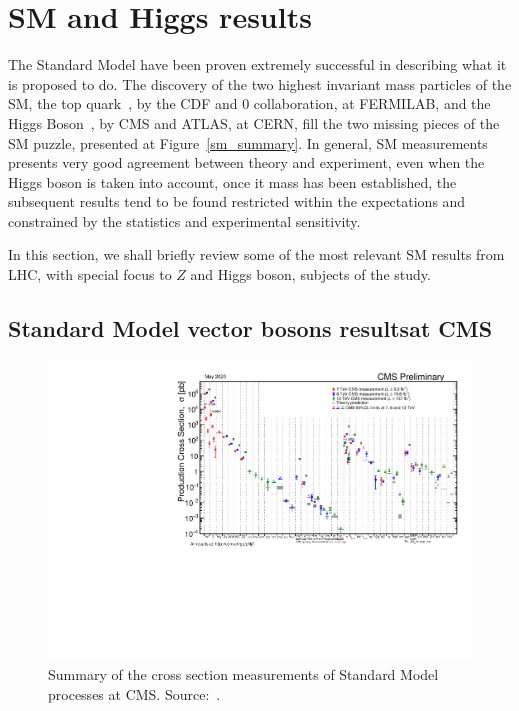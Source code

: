 \clearpage

\section{SM and Higgs results}
\label{section_sm_higgs}

The Standard Model have been proven extremely successful in describing what it is proposed to do. The discovery of the two highest invariant mass particles of the SM, the top quark~\cite{top_discovery_cdf,top_discovery_d0}, by the CDF and 0 collaboration, at FERMILAB, and the Higgs Boson~\cite{higgs_discovery_cms,higgs_discovery_atlas}, by CMS and ATLAS, at CERN, fill the two missing pieces of the SM puzzle, presented at Figure~\ref{sm_summary}. In general, SM measurements presents very good agreement between theory and experiment, even when the Higgs boson is taken into account, once it mass has been established, the subsequent results tend to be found restricted within the expectations and constrained by the statistics and experimental sensitivity.  

In this section, we shall briefly review some of the most relevant SM results from LHC, with special focus to $Z$ and Higgs boson, subjects of the study. 

\subsection{Standard Model vector bosons resultsat CMS}
\label{section_sm_vb_results}

\begin{figure}
  \centering
  \includegraphics[width=\textwidth]{figures_and_tables/theory/cms_sm_xsec.pdf}
  \caption{ Summary of the cross section measurements of Standard Model processes at CMS. Source:~\cite{cms_sm_xsec_summary}.}
  \label{cms_sm_xsec}
\end{figure}

